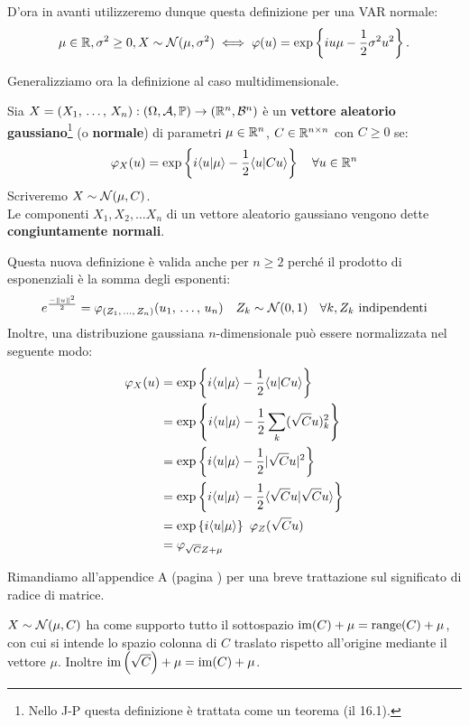D'ora in avanti utilizzeremo dunque questa definizione per una VAR normale:
  $$ \mu \in \mathbb R, \sigma^2 \geq 0, X \sim \mathcal N(\mu, \sigma^2) \iff \varphi(u) = \exp\left\{iu\mu-\frac{1}{2}\sigma^2u^2\right\}. $$

Generalizziamo ora la definizione al caso multidimensionale.

\begin{defn}\label{def-vett-gauss}
  Sia $X  = (X_1, \, \dots, \, X_n):\DoCo[n]$ è un \textbf{vettore aleatorio gaussiano}\footnote{Nello J-P questa definizione è trattata come un teorema (il 16.1).} (o \textbf{normale}) di parametri $\mu \in \mathbb R^n$, $C \in \mathbb R^{n \times n}$ con $C \geq 0$ se:
  $$\varphi_X (u) = \exp\left\{i \langle u |  \mu \rangle -\frac{1}{2} \langle u |  Cu \rangle\right\} \quad \forall u \in \mathbb R^n$$
  Scriveremo $X \sim \mathcal N(\mu, C)$. \\
  Le componenti $X_1,X_2, \dots X_n$ di un vettore aleatorio gaussiano vengono dette \textbf{congiuntamente normali}.
\end{defn}

\medskip
\begin{oss}
  Questa nuova definizione è valida anche per $n \geq 2$ perché il prodotto di esponenziali è la somma degli esponenti:
  $$ e^{\frac{-\norm{u}^2}{2}} = \varphi_{(Z_1, \, \dots, \, Z_n)} (u_1, \, \dots, \, u_n) \quad Z_k \sim \Nc(0,1) \; \ \ \forall k, Z_k \text{ indipendenti} $$
  Inoltre, una distribuzione gaussiana $n$-dimensionale può essere normalizzata nel seguente modo:
  \begin{align*}
  	\varphi_X (u)
  	&= \exp\left\{i\langle u | \mu \rangle  -\frac{1}{2}\langle u | Cu \rangle \right\} \\ 
  	&= \exp\left\{i\langle u | \mu \rangle-\frac{1}{2}\sum_k (\sqrt{C}u)_k^2\right\} \\
  	&= \exp\left\{i\langle u | \mu \rangle-\frac{1}{2}  \abs{\sqrt{C}u}^2\right\} \\
  	&= \exp\left\{i\langle u | \mu \rangle-\frac{1}{2}  \langle\sqrt{C}u | \sqrt{C}u \rangle \right\} \\
  	&= \exp\left\{i\langle u | \mu \rangle\right\} \ \varphi_Z(\sqrt{C}u) \\
  	&=\varphi_{\sqrt{C}Z + \mu}
  \end{align*}

\end{oss}
Rimandiamo all'appendice A (pagina \pageref{sqrt-C}) per una breve trattazione sul significato di radice di matrice.
\medskip
\begin{nb}
  $X \sim \mathcal N(\mu, C)$ ha come supporto tutto il sottospazio $\operatorname{im}(C)+\mu = \operatorname{range}(C)+\mu$, con cui si intende lo spazio colonna di $C$ traslato rispetto all'origine mediante il vettore $\mu$.
  Inoltre $\operatorname{im} \left( \sqrt{C} \right)+\mu=\operatorname{im}(C)+\mu$.
\end{nb}

